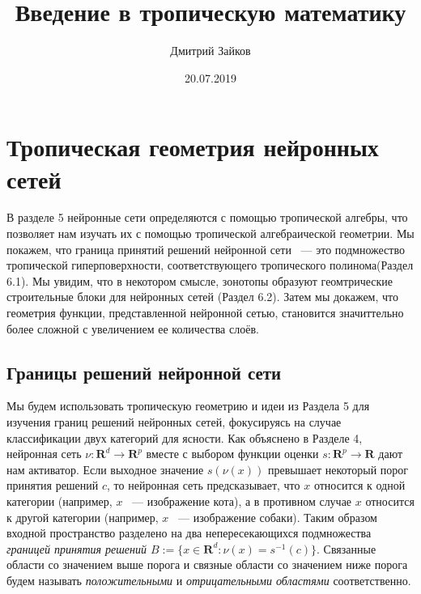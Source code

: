 \documentclass[russian]{lecture-notes}
\title{Введение в тропическую математику}
\author{Дмитрий Зайков}
\date{20.07.2019}
\begin{document}
	\section{Тропическая геометрия нейронных сетей}
	
	В разделе 5 нейронные сети определяются с помощью тропической алгебры, что позволяет нам изучать их с помощью тропической алгебраической геометрии. Мы покажем, что граница принятий решений нейронной сети ~--- это подмножество тропической гиперповерхности, соответствующего тропического полинома(Раздел 6.1). Мы увидим, что в некотором смысле, зонотопы образуют геомтрические строительные блоки для нейронных сетей (Раздел 6.2). Затем мы докажем, что геометрия функции, представленной нейронной сетью, становится значиттельно более сложной с увеличением ее количества слоёв.
	\subsection{Границы решений нейронной сети}
	
	Мы будем использовать тропическую геометрию и идеи из Раздела 5 для изучения границ решений нейронных сетей, фокусируясь на случае классификации двух категорий для ясности. Как объяснено в Разделе 4, нейронная сеть $\nu : \mathbf{R}^d \rightarrow \mathbf{R}^p$ вместе с выбором функции оценки $s: \mathbf{R}^p \rightarrow \mathbf{R}$ дают нам активатор. Если выходное значение $s(\nu(x))$ превышает некоторый порог принятия решений $c$, то нейронная сеть предсказывает, что $x$ относится к одной категории (например, $x$ ~--- изображение кота), а в противном случае $x$ относится к другой категории (например, $x$ ~--- изображение собаки). Таким образом входной пространство разделено на два непересекающихся подмножества \textit{границей принятия решений $B := \{x \in \mathbf{R}^d : \nu(x) = s^{-1}(c)\} $}. Связанные области со значением выше порога и связные области со значением ниже порога будем называть \textit{положительными} и \textit{отрицательными областями} соответственно.
	
\end{document}
